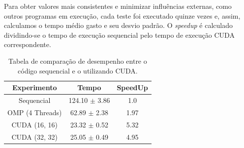 \documentclass[12pt]{article}
\begin{document}
Para obter valores mais consistentes e minimizar influências externas, como
outros programas em execução, cada teste foi executado quinze vezes e, assim,
calculamos o tempo médio gasto e seu desvio padrão. O \textit{speedup} é
calculado dividindo-se o tempo de execução sequencial pelo tempo de execução
CUDA correspondente.

\begin{table}[ht]
  \centering
  \caption{Tabela de comparação de desempenho entre o código sequencial e o
    utilizando CUDA.}\label{tab:Resultados}
  \vspace{0.3cm}
  \begin{tabular}{||c c c||}
    \hline
    Experimento     & Tempo             & SpeedUp \\ [0.5ex]
    \hline\hline
    Sequencial      & 124.10 $\pm$ 3.86 & 1.0     \\
    \hline
    OMP (4 Threads) & 62.89 $\pm$ 2.38  & 1.97    \\
    \hline
    CUDA (16, 16)   & 23.32 $\pm$ 0.52  & 5.32    \\
    \hline
    CUDA (32, 32)   & 25.05 $\pm$ 0.49  & 4.95    \\
    \hline
  \end{tabular}
\end{table}
\end{document}
